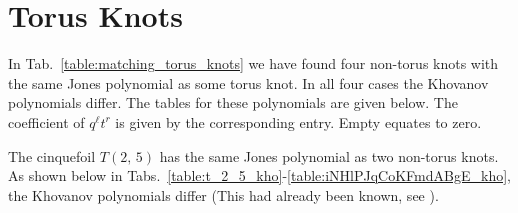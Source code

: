 \section{Torus Knots}
    \begin{table}
        \centering
        \caption{Knots whose Jones polynomial matches that of a Torus Knot}
        \label{table:matching_torus_knots}
    \end{table}
    In Tab.~\ref{table:matching_torus_knots}
    we have found four non-torus knots with the same
    Jones polynomial as some torus knot. In all four cases the Khovanov
    polynomials differ. The tables for these polynomials are given below.
    The coefficient of $q^{\ell}t^{r}$ is given by the corresponding entry.
    Empty equates to zero.
    \par\hfill\par
    The cinquefoil $T(2,\,5)$ has the same Jones polynomial as two
    non-torus knots. As shown below in
    Tabs.~\ref{table:t_2_5_kho}-\ref{table:iNHlPJqCoKFmdABgE_kho}, the
    Khovanov polynomials differ
    (This had already been known, see \cite{KatlasKhoHo}).
